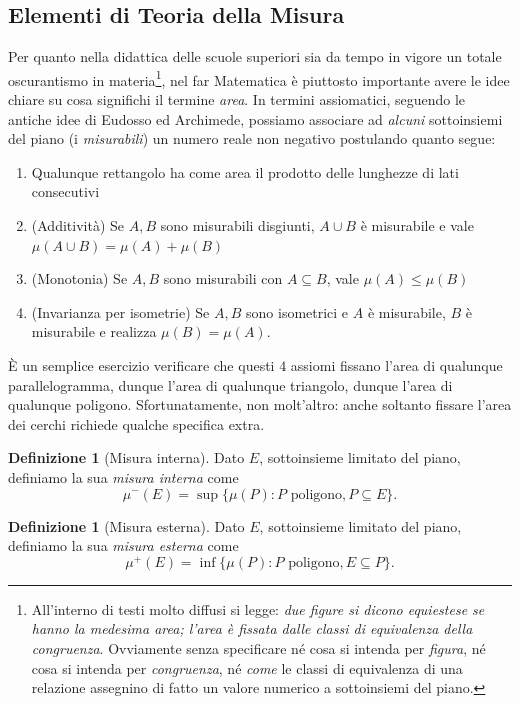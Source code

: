 \documentclass[a4paper,twoside]{article}
\theoremstyle{definition}
\newtheorem{definizione}[theorem]{Definizione}
\numberwithin{theorem}{section}
\begin{document}
\subsection{Elementi di Teoria della Misura}
Per quanto nella didattica delle scuole superiori sia da tempo in vigore un totale oscurantismo in materia\footnote{All'interno di testi molto diffusi si legge: \emph{due figure si dicono equiestese se hanno la medesima area; l'area è fissata dalle classi di equivalenza della congruenza}. Ovviamente senza specificare né cosa si intenda per \emph{figura}, né cosa si intenda per \emph{congruenza}, né \emph{come} le classi di equivalenza di una relazione assegnino di fatto un valore numerico a sottoinsiemi del piano.}, nel far Matematica è piuttosto importante avere le idee chiare su cosa significhi il termine \emph{area}. In termini assiomatici, seguendo le antiche idee di Eudosso ed Archimede, possiamo associare ad \emph{alcuni} sottoinsiemi del piano (i \emph{misurabili}) un numero reale non negativo postulando quanto segue: 
\begin{enumerate}
 \item Qualunque rettangolo ha come area il prodotto delle lunghezze di lati consecutivi
 \item (Additività) Se $A,B$ sono misurabili disgiunti, $A\cup B$ è misurabile e vale $\mu(A\cup B)=\mu(A)+\mu(B)$
 \item (Monotonia) Se $A,B$ sono misurabili con $A\subseteq B$, vale $\mu(A)\leq \mu(B)$
 \item (Invarianza per isometrie) Se $A,B$ sono isometrici e $A$ è misurabile, $B$ è misurabile e realizza $\mu(B)=\mu(A)$.
\end{enumerate}
È un semplice esercizio verificare che questi $4$ assiomi fissano l'area di qualunque parallelogramma, dunque l'area di qualunque triangolo, dunque l'area di qualunque poligono. Sfortunatamente, non molt'altro: anche soltanto fissare l'area dei cerchi richiede qualche specifica extra.

\begin{definizione}[Misura interna] Dato $E$, sottoinsieme limitato del piano, definiamo la sua \emph{misura interna} come 
$$ \mu^-(E)=\sup\{\mu(P): P\text{ poligono}, P\subseteq E\}. $$
\end{definizione}

\begin{definizione}[Misura esterna] Dato $E$, sottoinsieme limitato del piano, definiamo la sua \emph{misura esterna} come 
$$ \mu^+(E)=\inf\{\mu(P): P\text{ poligono}, E\subseteq P\}. $$
\end{definizione}
\end{document}
